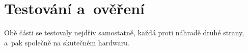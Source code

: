 \chapter{Testování a~ověření}
\label{chap:testovani}

Obě části se testovaly nejdřív samostatně, každá proti náhradě druhé strany, a~pak společně
na skutečném hardwaru.

